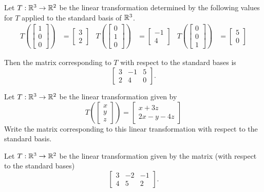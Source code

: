 \begin{applicationActivities}{1}{17}
\begin{example}
Let $T: \mathbb{R}^3 \rightarrow \mathbb{R}^2$ be the linear transformation determined by
the following values for \(T\) applied to the standard basis of \(\mathbb{R}^3\).
\begin{align*}
T\left(\begin{bmatrix} 1 \\ 0 \\ 0 \end{bmatrix} \right) &= \begin{bmatrix} 3 \\ 2\end{bmatrix} &
T\left(\begin{bmatrix} 0 \\ 1 \\ 0 \end{bmatrix} \right) &= \begin{bmatrix} -1 \\ 4\end{bmatrix} &
T\left(\begin{bmatrix} 0 \\ 0 \\ 1 \end{bmatrix} \right) &= \begin{bmatrix} 5 \\ 0\end{bmatrix}
\end{align*}

Then the matrix corresponding to $T$ with respect to the standard bases is $$\begin{bmatrix}3 & -1 & 5 \\ 2 & 4 & 0 \end{bmatrix}.$$
\end{example}

\begin{activity}{5}
  Let $T: \mathbb{R}^3 \rightarrow \mathbb{R}^2$ be the linear transformation given by
$$T\left(\begin{bmatrix} x\\ y \\ z \end{bmatrix} \right) = \begin{bmatrix} x+3z \\ 2x-y-4z \end{bmatrix}$$
Write the matrix corresponding to this linear transformation with respect to the standard basis.
\end{activity}

\begin{activity}{5}
  Let $T: \mathbb{R}^3 \rightarrow \mathbb{R}^2$ be the linear transformation given by the matrix (with respect to the standard bases) $$\begin{bmatrix} 3  & -2 & -1  \\ 4 & 5 & 2 \end{bmatrix}.$$


\end{activity}
\end{applicationActivities}
